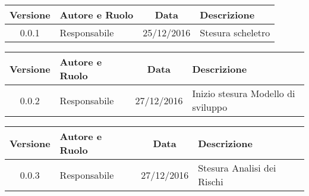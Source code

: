 
\begin{center}
	\begin{tabular}{cp{3cm}cp{3cm}}
	\textbf{Versione} & \textbf{Autore e Ruolo} & \textbf{Data} & \textbf{Descrizione} \\ \hline
	0.0.1 & {\LB} Responsabile & 25/12/2016 & Stesura scheletro \\ \hline
	\end{tabular}
\end{center}
\begin{center}
	\begin{tabular}{cp{3cm}cp{3cm}}
	\textbf{Versione} & \textbf{Autore e Ruolo} & \textbf{Data} & \textbf{Descrizione} \\ \hline
	0.0.2 & {\LB} Responsabile & 27/12/2016 &  Inizio stesura Modello di sviluppo  \\ \hline
	\end{tabular}
\end{center}
\begin{center}
	\begin{tabular}{cp{3cm}cp{3cm}}
	\textbf{Versione} & \textbf{Autore e Ruolo} & \textbf{Data} & \textbf{Descrizione} \\ \hline
	0.0.3 & {\PB} Responsabile & 27/12/2016 & Stesura Analisi dei Rischi\\ \hline
	\end{tabular}
\end{center}
